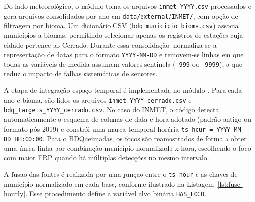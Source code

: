 Do lado meteorológico, o módulo  toma os arquivos \texttt{inmet\_YYYY.csv} processados e gera arquivos consolidados por ano em \texttt{data/external/INMET/}, com opção de filtragem por bioma. Um dicionário CSV (\texttt{bdq\_municipio\_bioma.csv}) associa municípios a biomas, permitindo selecionar apenas os registros de estações cuja cidade pertence ao Cerrado. Durante essa consolidação, normaliza-se a representação de datas para o formato \texttt{YYYY-MM-DD} e removem-se linhas em que todas as variáveis de medida assumem valores sentinela (\texttt{-999} ou \texttt{-9999}), o que reduz o impacto de falhas sistemáticas de sensores.

A etapa de integração espaço temporal é implementada no módulo . Para cada ano e bioma, são lidos os arquivos \texttt{inmet\_YYYY\_cerrado.csv} e \texttt{bdq\_targets\_YYYY\_cerrado.csv}. No caso do INMET, o código detecta automaticamente o esquema de colunas de data e hora adotado (padrão antigo ou formato pós 2019) e constrói uma marca temporal horária \texttt{ts\_hour = YYYY-MM-DD HH:00:00}. Para o BDQueimadas, os focos são reamostrados de forma a obter uma única linha por combinação município normalizado x hora, escolhendo o foco com maior FRP quando há múltiplas detecções no mesmo intervalo.

A fusão das fontes é realizada por uma junção entre o \texttt{ts\_hour} e as chaves de município normalizado em cada base, conforme ilustrado na Listagem~\ref{lst:fuse-hourly}. Esse procedimento define a variável alvo binária \texttt{HAS\_FOCO}.

